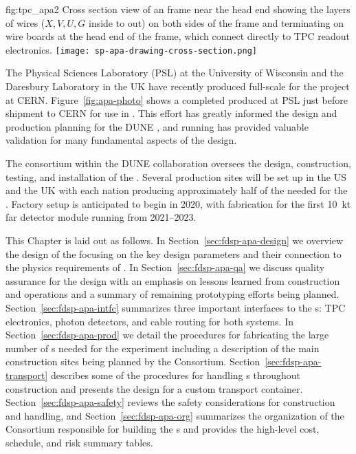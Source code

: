 \begin{dunefigure}{fig:tpc_apa2}
{Cross section view of an  frame near the head end showing the layers of wires ($X,V,U,G$ inside to out) on both sides of the frame and terminating on wire boards at the head end of the frame, which connect directly to TPC readout electronics.} 
\texttt{[image: sp-apa-drawing-cross-section.png]} 
\end{dunefigure} 

The Physical Sciences Laboratory (PSL) at the University of Wisconsin and the Daresbury Laboratory in the UK have recently produced full-scale  for the  project at CERN. Figure~\ref{fig:apa-photo} shows a completed  produced at PSL just before shipment to CERN for use in . This effort has greatly informed the design and production planning for the DUNE , and  running has provided valuable validation for many fundamental aspects of the   design. 

The  consortium within the DUNE collaboration oversees the design, construction, testing, and installation of the . Several  production sites will be set up in the US and the UK with each nation producing approximately half of the  needed for the %
.  Factory setup is anticipated to begin in 2020, with  fabrication for the first \SI{10}{kt} far detector module running from 2021--2023.  

This Chapter is laid out as follows.  In Section~\ref{sec:fdsp-apa-design} we overview the design of the  focusing on the key design parameters and their connection to the physics requirements of .  In Section~\ref{sec:fdsp-apa-qa} we discuss quality assurance for the design with an emphasis on lessons learned from  construction and operations and a summary of remaining prototyping efforts being planned. Section~\ref{sec:fdsp-apa-intfc} summarizes three important interfaces to the s: TPC electronics, photon detectors, and cable routing for both systems.  In Section~\ref{sec:fdsp-apa-prod} we detail the procedures for fabricating the large number of s needed for the experiment including a description of the main construction sites being planned by the  Consortium.  Section~\ref{sec:fdsp-apa-transport} describes some of the procedures for handling s throughout construction and presents the design for a custom transport container. Section~\ref{sec:fdsp-apa-safety} reviews the safety considerations for  construction and handling, and Section~\ref{sec:fdsp-apa-org} summarizes the organization of the  Consortium responsible for building the s and provides the high-level cost, schedule, and risk summary tables. 

